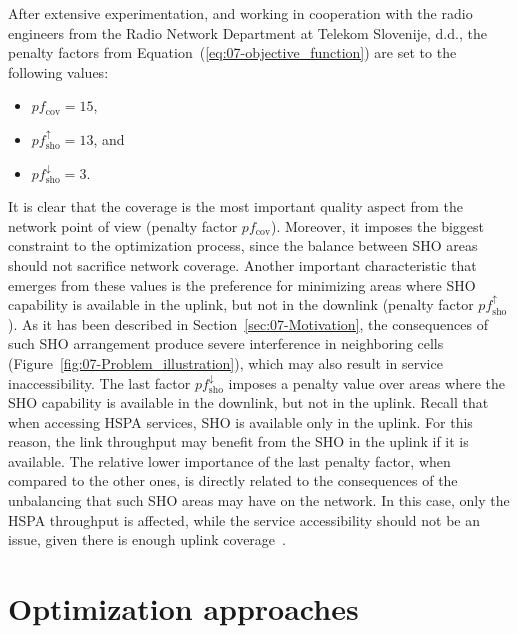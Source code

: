 After extensive experimentation, and working in cooperation with the
radio engineers from the Radio Network Department at Telekom Slovenije,
d.d., the penalty factors from Equation~(\ref{eq:07-objective_function})
are set to the following values:
\begin{itemize}
\item $pf_{\mathrm{cov}}=15$,
\item $pf_{\mathrm{sho}}^{\uparrow}=13$, and
\item $pf_{\mathrm{sho}}^{\downarrow}=3$.
\end{itemize}
It is clear that the coverage is the most important quality aspect
from the network point of view (penalty factor $pf_{\mathrm{cov}}$).
Moreover, it imposes the biggest constraint to the optimization process,
since the balance between SHO areas should not sacrifice network coverage.
Another important characteristic that emerges from these values is
the preference for minimizing areas where SHO capability is available
in the uplink, but not in the downlink (penalty factor $pf_{\mathrm{sho}}^{\uparrow}$).
As it has been described in Section~\ref{sec:07-Motivation}, the
consequences of such SHO arrangement produce severe interference in
neighboring cells (Figure~\ref{fig:07-Problem_illustration}), which
may also result in service inaccessibility. The last factor $pf_{\mathrm{sho}}^{\downarrow}$
imposes a penalty value over areas where the SHO capability is available
in the downlink, but not in the uplink. Recall that when accessing
HSPA services, SHO is available only in the uplink. For this reason,
the link throughput may benefit from the SHO in the uplink if it is
available. The relative lower importance of the last penalty factor,
when compared to the other ones, is directly related to the consequences
of the unbalancing that such SHO areas may have on the network. In
this case, only the HSPA throughput is affected, while the service
accessibility should not be an issue, given there is enough uplink
coverage~\cite{holma2006hsdpa}.


\section{Optimization approaches \label{sec:07-Optimization_algorithms}}

